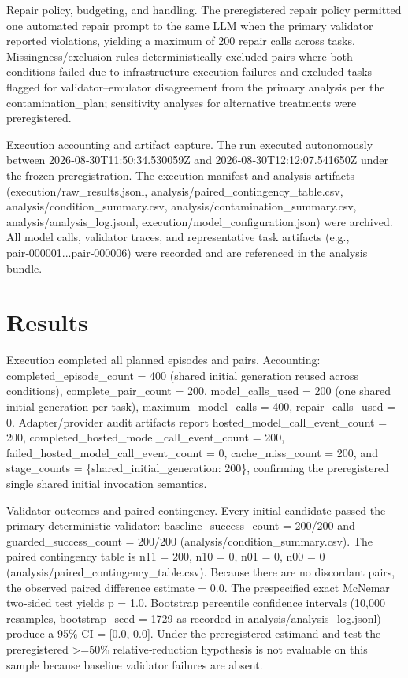 \documentclass[conference]{IEEEtran}
\begin{document}
Repair policy, budgeting, and handling. The preregistered repair policy permitted one automated repair prompt to the same LLM when the primary validator reported violations, yielding a maximum of 200 repair calls across tasks. Missingness/exclusion rules deterministically excluded pairs where both conditions failed due to infrastructure execution failures and excluded tasks flagged for validator--emulator disagreement from the primary analysis per the contamination\_plan; sensitivity analyses for alternative treatments were preregistered.

Execution accounting and artifact capture. The run executed autonomously between 2026‑08‑30T11:50:34.530059Z and 2026‑08‑30T12:12:07.541650Z under the frozen preregistration. The execution manifest and analysis artifacts (execution/raw\_results.jsonl, analysis/paired\_contingency\_table.csv, analysis/condition\_summary.csv, analysis/contamination\_summary.csv, analysis/analysis\_log.jsonl, execution/model\_configuration.json) were archived. All model calls, validator traces, and representative task artifacts (e.g., pair‑000001...pair‑000006) were recorded and are referenced in the analysis bundle.

\section{Results}
Execution completed all planned episodes and pairs. Accounting: completed\_episode\_count = 400 (shared initial generation reused across conditions), complete\_pair\_count = 200, model\_calls\_used = 200 (one shared initial generation per task), maximum\_model\_calls = 400, repair\_calls\_used = 0. Adapter/provider audit artifacts report hosted\_model\_call\_event\_count = 200, completed\_hosted\_model\_call\_event\_count = 200, failed\_hosted\_model\_call\_event\_count = 0, cache\_miss\_count = 200, and stage\_counts = \{shared\_initial\_generation: 200\}, confirming the preregistered single shared initial invocation semantics.

Validator outcomes and paired contingency. Every initial candidate passed the primary deterministic validator: baseline\_success\_count = 200/200 and guarded\_success\_count = 200/200 (analysis/condition\_summary.csv). The paired contingency table is n11 = 200, n10 = 0, n01 = 0, n00 = 0 (analysis/paired\_contingency\_table.csv). Because there are no discordant pairs, the observed paired difference estimate = 0.0. The prespecified exact McNemar two‑sided test yields p = 1.0. Bootstrap percentile confidence intervals (10,000 resamples, bootstrap\_seed = 1729 as recorded in analysis/analysis\_log.jsonl) produce a 95\% CI = [0.0, 0.0]. Under the preregistered estimand and test the preregistered >=50\% relative‑reduction hypothesis is not evaluable on this sample because baseline validator failures are absent.
\end{document}
